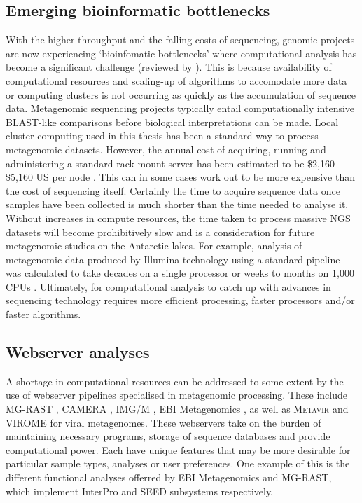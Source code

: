 \subsection{Emerging bioinformatic bottlenecks}
With the higher throughput and the falling costs of sequencing, genomic projects are now experiencing `bioinfomatic bottlenecks' where computational analysis has become a significant challenge (reviewed by \citet{Scholz2012}).
This is because availability of computational resources and scaling-up of algorithms to accomodate more data or computing clusters is not occurring as quickly as the accumulation of sequence data.
Metagenomic sequencing projects typically entail computationally intensive \acs{BLAST}-like comparisons before biological interpretations can be made.
Local cluster computing used in this thesis has been a standard way to process metagenomic datasets.
However, the annual cost of acquiring, running and administering a standard rack mount server has been estimated to be \$2,160--\$5,160 US per node \cite{Wilkening2009}.
This can in some cases work out to be more expensive than the cost of sequencing itself.
Certainly the time to acquire sequence data once samples have been collected is much shorter than the time needed to analyse it.
Without increases in compute resources, the time taken to process massive \ac{NGS} datasets will become prohibitively slow and is a consideration for future metagenomic studies on the Antarctic lakes.
For example, analysis of metagenomic data produced by Illumina technology using a standard pipeline was calculated to take decades on a single processor or weeks to months on 1,000 \acs{CPU}s \cite{Evanko2009}.
Ultimately, for computational analysis to catch up with advances in sequencing technology requires more efficient processing, faster processors and/or faster algorithms.

\subsection{Webserver analyses}
A shortage in computational resources can be addressed to some extent by the use of webserver pipelines specialised in metagenomic processing.
These include \ac{MG-RAST} \cite{Meyer2008}, \ac{CAMERA} \cite{Sun2011}, \ac{IMG/M} \cite{Markowitz2008, Markowitz2012}, EBI Metagenomics \cite{Hunter2012}, as well as \textsc{Metavir} \cite{Roux2011} and \ac{VIROME} \cite{Wommack2012} for viral metagenomes.
These webservers take on the burden of maintaining necessary programs, storage of sequence databases and provide computational power.
Each have unique features that may be more desirable for particular sample types, analyses or user preferences.
One example of this is the different functional analyses offerred by EBI Metagenomics and \ac{MG-RAST}, which implement InterPro and SEED subsystems respectively.

